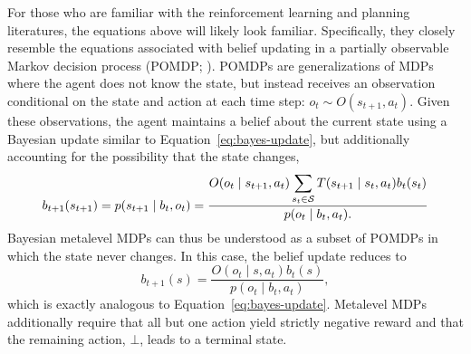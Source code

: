 For those who are familiar with the reinforcement learning and planning literatures, the equations above will likely look familiar. Specifically, they closely resemble the equations associated with belief updating in a partially observable Markov decision process (POMDP; \citealp{kaelbling1998planningb}). POMDPs are generalizations of MDPs where the agent does not know the state, but instead receives an observation conditional on the state and action at each time step: $o_t \sim O(s_{t+1}, a_t)$. Given these observations, the agent maintains a belief about the current state using a Bayesian update similar to Equation~\ref{eq:bayes-update}, but additionally accounting for the possibility that the state changes,
%
\begin{equation}\label{eq:pomdp-update}
  b_{t+1}(s_{t+1}) = p(s_{t+1} \mid b_t, o_t) = \frac{
    O(o_t \mid s_{t+1}, a_t) \displaystyle\sum_{s_t \in \S} T(s_{t+1} \mid s_t, a_t) b_t(s_t)
  }{
    p(o_t \mid b_t, a_t).
  } 
\end{equation}
%
Bayesian metalevel MDPs can thus be understood as a subset of POMDPs in which the state never changes. In this case, the belief update reduces to
\begin{equation}
  b_{t+1}(s) =  
  \frac{O(o_t \mid s, a_t) b_t(s)}{p(o_t \mid b_t, a_t)},
\end{equation}
which is exactly analogous to Equation~\ref{eq:bayes-update}.
Metalevel MDPs additionally require that all but one action yield strictly negative reward and that the remaining action, $\bot$, leads to a terminal state.

